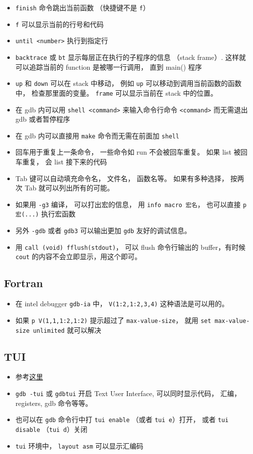 \begin{itemize}
\item \verb`finish` 命令跳出当前函数 （快捷键不是 \verb`f`）
\item \verb`f` 可以显示当前的行号和代码
\item \verb`until <number>` 执行到指定行
\item \verb`backtrace` 或 \verb`bt` 显示每层正在执行的子程序的信息 （stack frame）. 这样就可以追踪当前的 function 是被哪一行调用， 直到 main() 程序
\item \verb|up| 和 \verb|down| 可以在 stack 中移动， 例如 \verb|up| 可以移动到调用当前函数的函数中， 检查那里面的变量。 \verb`frame` 可以显示当前在 stack 中的位置。
\item 在 gdb 内可以用 \verb`shell <command>` 来输入命令行命令 \verb`<command>` 而无需退出 gdb 或者暂停程序
\item 在 gdb 内可以直接用 \verb`make` 命令而无需在前面加 \verb`shell`
\item 回车用于重复上一条命令， 一些命令如 run 不会被回车重复。 如果 list 被回车重复， 会 list 接下来的代码
\item Tab 键可以自动填充命令名， 文件名， 函数名等。 如果有多种选择， 按两次 Tab 就可以列出所有的可能。
\item 如果用 \verb|-g3| 编译， 可以打出宏的信息， 用 \verb|info macro 宏名|， 也可以直接 \verb|p 宏(...)| 执行宏函数
\item 另外 \verb|-gdb| 或者 \verb|gdb3| 可以输出更加 \verb|gdb| 友好的调试信息。
\item 用 \verb|call (void) fflush(stdout)|， 可以 flush 命令行输出的 buffer，有时候 \verb|cout| 的内容不会立即显示，用这个即可。
\end{itemize}

\subsection{Fortran}
\begin{itemize}
\item 在 intel debugger \verb`gdb-ia` 中， \verb`V(1:2,1:2,3,4)` 这种语法是可以用的。
\item 如果 \verb`p V(1,1,1:2,1:2)` 提示超过了 \verb`max-value-size`， 就用 \verb`set max-value-size unlimited` 就可以解决
\end{itemize}

\subsection{TUI}
\begin{itemize}
\item 参考\href{https://developer.apple.com/library/archive/documentation/DeveloperTools/gdb/gdb/gdb_toc.html#TOC229}{这里}
\item \verb`gdb -tui` 或 \verb`gdbtui` 开启 Text User Interface, 可以同时显示代码， 汇编， registers, gdb 命令等等。
\item 也可以在 \verb|gdb| 命令行中打 \verb|tui enable| （或者 \verb|tui e|）打开， 或者 \verb|tui disable| （\verb|tui d|）关闭
\item \verb|tui| 环境中， \verb|layout asm| 可以显示汇编码
\end{itemize}


